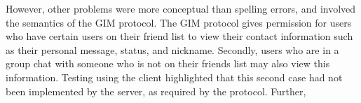 However, other problems were more conceptual than spelling errors, and involved the semantics of the GIM protocol. The GIM protocol gives permission for users who have certain users on their friend list to view their contact information such as their personal message, status, and nickname. Secondly, users who are in a group chat with someone who is not on their friends list may also view this information. Testing using the client highlighted that this second case had not been implemented by the server, as required by the protocol. Further, 
